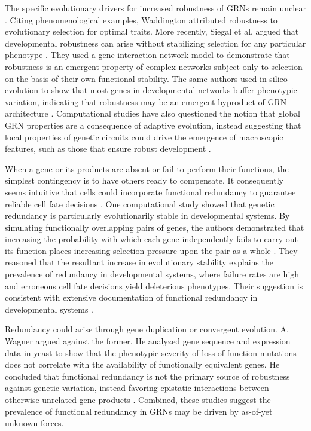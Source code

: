 The specific evolutionary drivers for increased robustness of GRNs remain unclear \cite{Siegal2014}. Citing phenomenological examples, Waddington attributed robustness to evolutionary selection for optimal traits. More recently, Siegal et al. argued that developmental robustness can arise without stabilizing selection for any particular phenotype \cite{Siegal2002}. They used a gene interaction network model to demonstrate that robustness is an emergent property of complex networks subject only to selection on the basis of their own functional stability. The same authors used in silico evolution to show that most genes in developmental networks buffer phenotypic variation, indicating that robustness may be an emergent byproduct of GRN architecture \cite{Bergman2003}. Computational studies have also questioned the notion that global GRN properties are a consequence of adaptive evolution, instead suggesting that local properties of genetic circuits could drive the emergence of macroscopic features, such as those that ensure robust development \cite{Lynch2007,Wagner2003}.

When a gene or its products are absent or fail to perform their functions, the simplest contingency is to have others ready to compensate. It consequently seems intuitive that cells could incorporate functional redundancy to guarantee reliable cell fate decisions \cite{Hartman2001,McAdams1999}. One computational study showed that genetic redundancy is particularly evolutionarily stable in developmental systems. By simulating functionally overlapping pairs of genes, the authors demonstrated that increasing the probability with which each gene independently fails to carry out its function places increasing selection pressure upon the pair as a whole \cite{Nowak1997}. They reasoned that the resultant increase in evolutionary stability explains the prevalence of redundancy in developmental systems, where failure rates are high and erroneous cell fate decisions yield deleterious phenotypes. Their suggestion is consistent with extensive documentation of functional redundancy in developmental systems \cite{Kitano2004}. 

Redundancy could arise through gene duplication or convergent evolution. A. Wagner argued against the former. He analyzed gene sequence and expression data in yeast to show that the phenotypic severity of loss-of-function mutations does not correlate with the availability of functionally equivalent genes. He concluded that functional redundancy is not the primary source of robustness against genetic variation, instead favoring epistatic interactions between otherwise unrelated gene products \cite{Wagner2000}. Combined, these studies suggest the prevalence of functional redundancy in GRNs may be driven by as-of-yet unknown forces.
